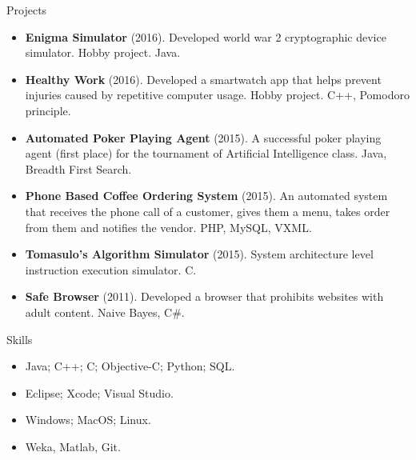 \documentclass[]{mcdowellcv}
\begin{document}
	
	\begin{cvsection}{Projects}
		\begin{cvsubsection}{}{}{}
			\begin{itemize}
			\item \textbf{Enigma Simulator} (2016).  Developed world war 2 cryptographic device simulator. Hobby project.  Java.
				\item \textbf{Healthy Work} (2016). Developed a smartwatch app that helps prevent injuries caused by repetitive computer usage. Hobby project. C++, Pomodoro principle.				
				\item \textbf{Automated Poker Playing Agent} (2015). A successful poker playing agent (first place) for the tournament of Artificial Intelligence class. Java, Breadth First Search.
				\item \textbf{Phone Based Coffee Ordering System} (2015). An automated system that receives the phone call of a customer, gives them a menu, takes order from them and notifies the vendor.  PHP, MySQL, VXML.
				\item \textbf{Tomasulo’s Algorithm Simulator} (2015). System architecture level instruction execution simulator. C.
\item \textbf{Safe Browser} (2011). Developed a browser that prohibits websites with adult content. Naive Bayes, C\#.
			\end{itemize}
		\end{cvsubsection}
	\end{cvsection}
	
	
	\begin{cvsection}{Skills}
		\begin{cvsubsection}{}{}{}	
			\begin{itemize}
				\item Java; C++; C; Objective-C; Python; SQL.  
				\item Eclipse; Xcode; Visual Studio.
				\item Windows; MacOS; Linux. 
				\item Weka, Matlab, Git.
			\end{itemize}
		\end{cvsubsection}
	\end{cvsection}
	
\end{document}
